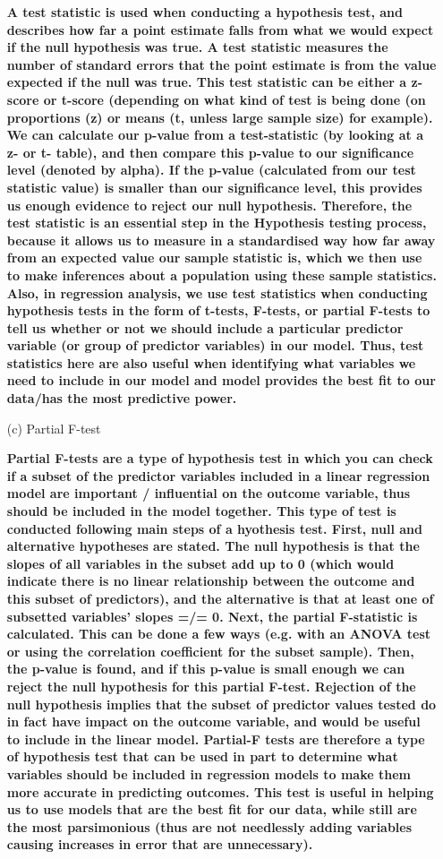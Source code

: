 \documentclass[12pt,letterpaper]{article}
\begin{document}
\begin{enumerate}
\textbf{	A test statistic is used when conducting a hypothesis test, and describes how far a point estimate falls from what we would expect if the null hypothesis was true. A test statistic measures the number of standard errors that the point estimate is from the value expected if the null was true. This test statistic can be either a z-score or t-score (depending on what kind of test is being done (on proportions (z) or means (t, unless large sample size) for example). We can calculate our p-value from a test-statistic (by looking at a z- or t- table), and then compare this p-value to our significance level (denoted by alpha). If the p-value (calculated from our test statistic value) is smaller than our significance level, this provides us enough evidence to reject our null hypothesis. Therefore, the test statistic is an essential step in the Hypothesis testing process, because it allows us to measure in a standardised way how far away from an expected value our sample statistic is, which we then use to make inferences about a  population using these sample statistics. Also, in regression analysis, we use test statistics when conducting hypothesis tests in the form of t-tests, F-tests, or partial F-tests to tell us whether or not we should include a particular predictor variable (or group of predictor variables) in our model. Thus, test statistics here are also useful when identifying what variables we need to include in our model and model provides the best fit to our data/has the most predictive power. }
		
	\item [(c)] Partial F-test
	
	\textbf{Partial F-tests are a type of hypothesis test in which you can check if a subset of the predictor variables included in a linear regression model are important / influential on the outcome variable, thus should be included in the model together. This type of test is conducted following main steps of a hyothesis test. First, null and alternative hypotheses are stated. The null hypothesis is that the slopes of all variables in the subset add up to 0 (which would indicate there is no linear relationship between the outcome and this subset of predictors), and the alternative is that at least one of subsetted variables' slopes =/= 0. Next, the partial F-statistic is calculated. This can be done a few ways (e.g. with an ANOVA test or using the correlation coefficient for the subset sample). Then, the p-value is found, and if this p-value is small enough we can reject the null hypothesis for this partial F-test. Rejection of the null hypothesis implies that the subset of predictor values tested do in fact have impact on the outcome variable, and would be useful to include in the linear model. Partial-F tests are therefore a type of hypothesis test that can be used in part to determine what variables should be included in regression models to make them more accurate in predicting outcomes. This test is useful in helping us to use models that are the best fit for our data, while still are the most parsimonious (thus are not needlessly adding variables causing increases in error that are unnecessary). } 
			

\end{enumerate}
\end{document}
